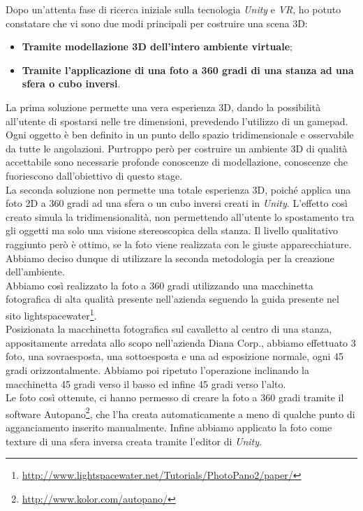 Dopo un'attenta fase di ricerca iniziale sulla tecnologia \textit{Unity} e \textit{VR}, ho potuto constatare che vi sono due modi principali per costruire una scena 3D:

\begin{itemize}
	\item \textbf{Tramite modellazione 3D dell'intero ambiente virtuale};
	\item \textbf{Tramite l'applicazione di una foto a 360 gradi di una stanza ad una sfera o cubo inversi}.
\end{itemize}

La prima soluzione permette una vera esperienza 3D, dando la possibilità all'utente di spostarsi nelle tre dimensioni, prevedendo l'utilizzo di un gamepad. Ogni oggetto è ben definito in un punto dello spazio tridimensionale e osservabile da tutte le angolazioni. Purtroppo però per costruire un ambiente 3D di qualità accettabile sono necessarie profonde conoscenze di modellazione, conoscenze che fuoriescono dall'obiettivo di questo stage. \\
La seconda soluzione non permette una totale esperienza 3D, poiché applica una foto 2D a 360 gradi ad una sfera o un cubo inversi creati in \textit{Unity}. L'effetto così creato simula la tridimensionalità, non permettendo all'utente lo spostamento tra gli oggetti ma solo una visione stereoscopica della stanza. Il livello qualitativo raggiunto però è ottimo, se la foto viene realizzata con le giuste apparecchiature. Abbiamo deciso dunque di utilizzare la seconda metodologia per la creazione dell'ambiente. \\
Abbiamo così realizzato la foto a 360 gradi utilizzando una macchinetta fotografica di alta qualità presente nell'azienda seguendo la guida presente nel sito lightspacewater\footnote[2]{\url{http://www.lightspacewater.net/Tutorials/PhotoPano2/paper/}}. \\
Posizionata la macchinetta fotografica sul cavalletto al centro di una stanza, appositamente arredata allo scopo nell'azienda Diana Corp., abbiamo effettuato 3 foto, una sovraesposta, una sottoesposta e una ad esposizione normale, ogni 45 gradi orizzontalmente. Abbiamo poi ripetuto l'operazione inclinando la macchinetta 45 gradi verso il basso ed infine 45 gradi verso l'alto. \\ 
Le foto così ottenute, ci hanno permesso di creare la foto a 360 gradi tramite il software Autopano\footnote[3]{\url{http://www.kolor.com/autopano/}}, che l'ha creata automaticamente a meno di qualche punto di agganciamento inserito manualmente. Infine abbiamo applicato la foto come texture di una sfera inversa creata tramite l'editor di \textit{Unity}.

